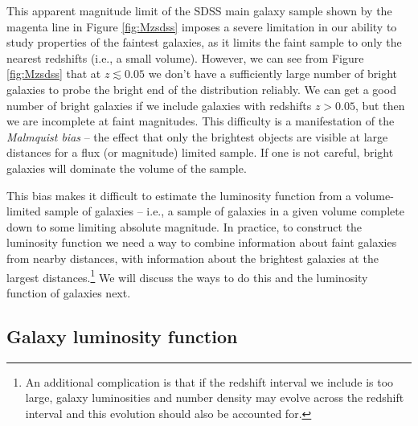 This apparent magnitude limit of the SDSS main galaxy sample shown by the magenta line in Figure \ref{fig:Mzsdss} imposes a severe limitation in our ability to study properties of the faintest galaxies, as it limits the faint sample to only the nearest redshifts (i.e., a small volume). However, we can see from Figure \ref{fig:Mzsdss} that at $z\lesssim 0.05$ we don't have a sufficiently large number of bright galaxies to probe the bright end of the distribution reliably.
 We can get a good number of bright galaxies if we include galaxies with redshifts $z>0.05$, but then we 
 are incomplete at faint magnitudes. This difficulty is a manifestation of the {\it Malmquist bias\/} \href{http://adsabs.harvard.edu/abs/1922MeLuF.100....1M}{\citep{malmquist22}} -- the effect that only the brightest objects are visible at large distances for a flux (or magnitude) limited sample. If one is not careful, bright galaxies will dominate the volume of the sample.  

This bias makes it difficult to estimate the luminosity function from a volume-limited sample of galaxies -- i.e., a sample of galaxies in a given volume complete down to some limiting absolute magnitude. In practice, to construct the luminosity function we need a way to combine information about faint galaxies from nearby distances, with information about the brightest galaxies at the largest distances.\footnote{An additional complication is that if the redshift interval we include is too large, galaxy luminosities and number density may evolve across the redshift interval and this evolution should also be accounted for.}
We will discuss the ways to do this and the luminosity function of galaxies next. 

\subsection{Galaxy luminosity function}
\label{sec:lf}

